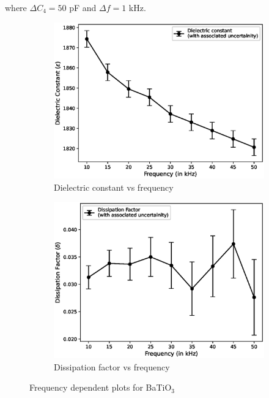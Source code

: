 		where $\Delta C_4 = 50$ pF and $\Delta f = 1$ kHz.

		\begin{figure}[H]
			\begin{subfigure}{\linewidth}
			\includegraphics[width=1\textwidth]{images/batio3_e.eps}
			\caption{Dielectric constant vs frequency}
			\end{subfigure}
			
			\begin{subfigure}{\linewidth}
			\includegraphics[width=1\textwidth]{images/batio3_d.eps}
			\caption{Dissipation factor vs frequency}
			\label{g1b}
			\end{subfigure}

			\caption{Frequency dependent plots for BaTiO$_3$}
			\label{g1}
		\end{figure}

